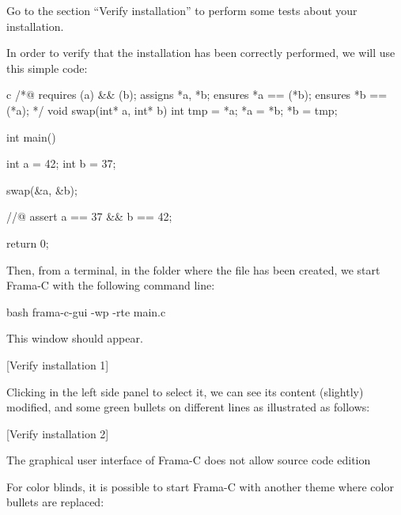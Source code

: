 \documentclass[middle]{zmdocument}
\begin{document}
Go to the section ``Verify installation'' to perform some tests about
your installation.






In order to verify that the installation has been correctly performed,
we will use this simple code:



\begin{CodeBlock}{c}
/*@
  requires \valid(a) && \valid(b);
  assigns *a, *b;
  ensures *a == \old(*b);
  ensures *b == \old(*a);
*/
void swap(int* a, int* b){
  int tmp = *a;
  *a = *b;
  *b = tmp;
}

int main(){
  int a = 42;
  int b = 37;

  swap(&a, &b);

  //@ assert a == 37 && b == 42;

  return 0;
}
\end{CodeBlock}



Then, from a terminal, in the folder where the file has been created, we
start Frama-C with the following command line:



\begin{CodeBlock}{bash}
frama-c-gui -wp -rte main.c
\end{CodeBlock}



This window should appear.



[Verify installation 1]


Clicking  in the left side panel to select it, we can see
its content (slightly) modified, and some green bullets on different
lines as illustrated as follows:



[Verify installation 2]




\begin{Warning}
  The graphical user interface of Frama-C does not allow source code edition
\end{Warning}


\begin{Information}
  For color blinds, it is possible to start Frama-C with another theme where
  color bullets are replaced:
  
\end{Information}
\end{document}

